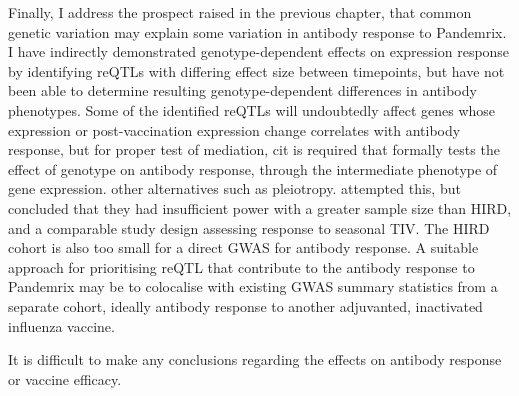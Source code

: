 Finally, I address the prospect raised in the previous chapter, that common genetic variation may explain some variation in antibody response to Pandemrix.
I have indirectly demonstrated genotype-dependent effects on expression response by identifying reQTLs with differing effect size between timepoints,
but have not been able to determine resulting genotype-dependent differences in antibody phenotypes.
Some of the identified reQTLs will undoubtedly affect genes whose expression or post-vaccination expression change correlates with antibody response, 
but for proper test of mediation, cit is required that formally tests the effect of genotype on antibody response, through the intermediate phenotype of gene expression.
other alternatives such as pleiotropy.
\autocite{franco2013IntegrativeGenomicAnalysis} attempted this, but concluded that they had insufficient power with a greater sample size than \gls{HIRD}, and a comparable study design assessing response to seasonal \gls{TIV}.
The \gls{HIRD} cohort is also too small for a direct \gls{GWAS} for antibody response.
A suitable approach for prioritising reQTL that contribute to the antibody response to Pandemrix may be to colocalise with existing GWAS summary statistics from a separate cohort, ideally antibody response to another adjuvanted, inactivated influenza vaccine.


It is difficult to make any conclusions regarding the effects on antibody response or vaccine efficacy.

